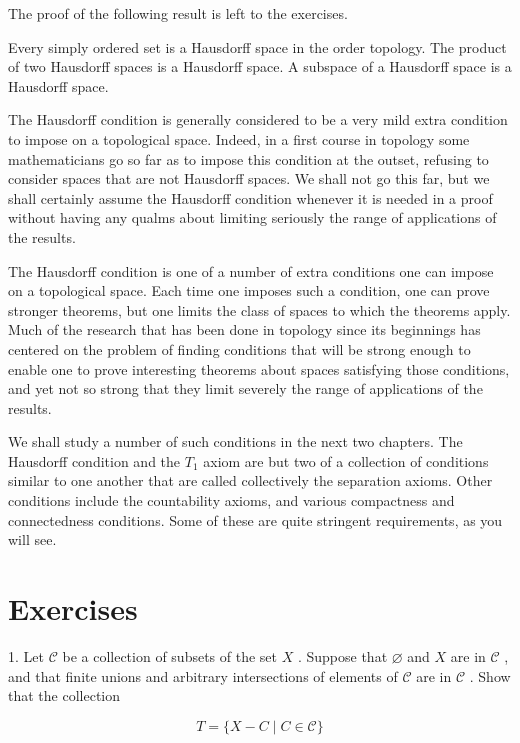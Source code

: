 The proof of the following result is left to the exercises.

\begin{theorem} Every simply ordered set is a Hausdorff space in the order topology. The product of two Hausdorff spaces is a Hausdorff space. A subspace of a Hausdorff space is a Hausdorff space.

The Hausdorff condition is generally considered to be a very mild extra condition to impose on a topological space. Indeed, in a first course in topology some mathematicians go so far as to impose this condition at the outset, refusing to consider spaces that are not Hausdorff spaces. We shall not go this far, but we shall certainly assume the Hausdorff condition whenever it is needed in a proof without having any qualms about limiting seriously the range of applications of the results.

The Hausdorff condition is one of a number of extra conditions one can impose on a topological space. Each time one imposes such a condition, one can prove stronger theorems, but one limits the class of spaces to which the theorems apply. Much of the research that has been done in topology since its beginnings has centered on the problem of finding conditions that will be strong enough to enable one to prove interesting theorems about spaces satisfying those conditions, and yet not so strong that they limit severely the range of applications of the results.

We shall study a number of such conditions in the next two chapters. The Hausdorff condition and the \({T}_{1}\) axiom are but two of a collection of conditions similar to one another that are called collectively the separation axioms. Other conditions include the countability axioms, and various compactness and connectedness conditions. Some of these are quite stringent requirements, as you will see.

\end{theorem}
\section*{Exercises}

1. Let \(\mathcal{C}\) be a collection of subsets of the set \(X\) . Suppose that \(\varnothing\) and \(X\) are in \(\mathcal{C}\) , and that finite unions and arbitrary intersections of elements of \(\mathcal{C}\) are in \(\mathcal{C}\) . Show that the collection

\[
T = \{ X - C \mid  C \in  \mathcal{C}\}
\]

